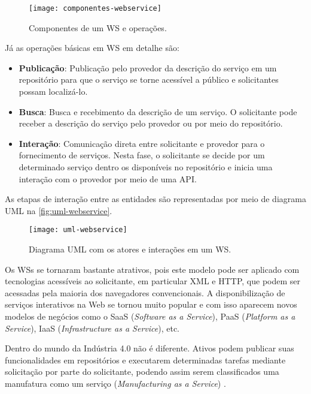 	\begin{figure}[htb]
		\centering
		\caption{Componentes de um WS e operações.}
		\label{fig:componentes-webservice}
		\texttt{[image: componentes-webservice]}
	\end{figure}
	
	Já as operações básicas em WS em detalhe são:
	
	\begin{itemize}
		\item \textbf{Publicação}: Publicação pelo provedor da descrição do serviço em um repositório para que o serviço se torne acessível a público e solicitantes possam localizá-lo. 
		\item \textbf{Busca}: Busca e recebimento da descrição de um serviço. O solicitante pode receber a descrição do serviço pelo provedor ou por meio do repositório.
		\item \textbf{Interação}: Comunicação direta entre solicitante e provedor para o fornecimento de serviços. Nesta fase, o solicitante se decide por um determinado serviço dentro os disponíveis no repositório e inicia uma interação com o provedor por meio de uma API.
	\end{itemize}
	
	As etapas de interação entre as entidades são representadas por meio de diagrama UML na \autoref{fig:uml-webservice}.
	
	\begin{figure}[htb]
		\centering
		\caption{Diagrama UML com os atores e interações em um WS.}
		\label{fig:uml-webservice}
		\texttt{[image: uml-webservice]}
	\end{figure}

	Os WSs se tornaram bastante atrativos, pois este modelo pode ser aplicado com tecnologias acessíveis ao solicitante, em particular XML e HTTP, que podem ser acessadas pela maioria dos navegadores convencionais. A disponibilização de serviços interativos na Web se tornou muito popular e com isso aparecem novos modelos de negócios como o SaaS (\textit{Software as a Service}), PaaS (\textit{Platform as a Service}), IaaS (\textit{Infrastructure as a Service}), etc.
	
	Dentro do mundo da Indústria 4.0 não é diferente. Ativos podem publicar suas funcionalidades em repositórios e executarem determinadas tarefas mediante solicitação por parte do solicitante, podendo assim serem classificados uma manufatura como um serviço (\textit{Manufacturing as a Service}) \cite{annunziata2019maas, nichols2020maas, siepen2019maas}.
	
